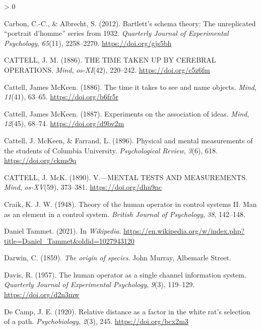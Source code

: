 \documentclass[
  oneside,
  12pt]{crumpbook}
\newlength{\cslhangindent}
\newenvironment{CSLReferences}[2] %
 {%
  \setlength{\parindent}{0pt}
  \ifodd #1 \everypar{\setlength{\hangindent}{\cslhangindent}}\ignorespaces\fi
  \ifnum #2 > 0
  \setlength{\parskip}{#2\baselineskip}
  \fi
 }%
 {}
\begin{document}
\begin{CSLReferences}{1}{0}
\leavevmode\hypertarget{ref-carbonBartlettSchemaTheory2012}{}%
Carbon, C.-C., \& Albrecht, S. (2012). Bartlett's schema theory: {The} unreplicated {``portrait d'homme''} series from 1932. \emph{Quarterly Journal of Experimental Psychology}, \emph{65}(11), 2258--2270. \url{https://doi.org/gjs5bh}

\leavevmode\hypertarget{ref-cattellTIMETAKENCEREBRAL1886}{}%
CATTELL, J. M. (1886). {THE TIME TAKEN UP BY CEREBRAL OPERATIONS}. \emph{Mind}, \emph{os-XI}(42), 220--242. \url{https://doi.org/c5z6fm}

\leavevmode\hypertarget{ref-cattellTimeItTakes1886}{}%
Cattell, James McKeen. (1886). The time it takes to see and name objects. \emph{Mind}, \emph{11}(41), 63--65. \url{https://doi.org/b6fr5r}

\leavevmode\hypertarget{ref-cattellExperimentsAssociationIdeas1887}{}%
Cattell, James McKeen. (1887). Experiments on the association of ideas. \emph{Mind}, \emph{12}(45), 68--74. \url{https://doi.org/d9bv2m}

\leavevmode\hypertarget{ref-cattellPhysicalMentalMeasurements1896}{}%
Cattell, J. McKeen, \& Farrand, L. (1896). Physical and mental measurements of the students of {Columbia University}. \emph{Psychological Review}, \emph{3}(6), 618. \url{https://doi.org/ckms9q}

\leavevmode\hypertarget{ref-cattellMENTALTESTSMEASUREMENTS1890}{}%
CATTELL, J. McK. (1890). V.---{MENTAL TESTS AND MEASUREMENTS}. \emph{Mind}, \emph{os-XV}(59), 373--381. \url{https://doi.org/dhn9nc}

\leavevmode\hypertarget{ref-craikTheoryHumanOperator1948}{}%
Craik, K. J. W. (1948). Theory of the human operator in control systems {II}. {Man} as an element in a control system. \emph{British Journal of Psychology}, \emph{38}, 142--148.

\leavevmode\hypertarget{ref-DanielTammet2021}{}%
Daniel {Tammet}. (2021). In \emph{Wikipedia}. \url{https://en.wikipedia.org/w/index.php?title=Daniel_Tammet\&oldid=1027943120}

\leavevmode\hypertarget{ref-darwinOriginSpecies1859}{}%
Darwin, C. (1859). \emph{The origin of species}. {John Murray, Albemarle Street}.

\leavevmode\hypertarget{ref-davisHumanOperatorSingle1957}{}%
Davis, R. (1957). The human operator as a single channel information system. \emph{Quarterly Journal of Experimental Psychology}, \emph{9}(3), 119--129. \url{https://doi.org/d2n3mw}

\leavevmode\hypertarget{ref-decampRelativeDistanceFactor1920}{}%
De Camp, J. E. (1920). Relative distance as a factor in the white rat's selection of a path. \emph{Psychobiology}, \emph{2}(3), 245. \url{https://doi.org/bcx2m3}


\end{CSLReferences}
\end{document}
